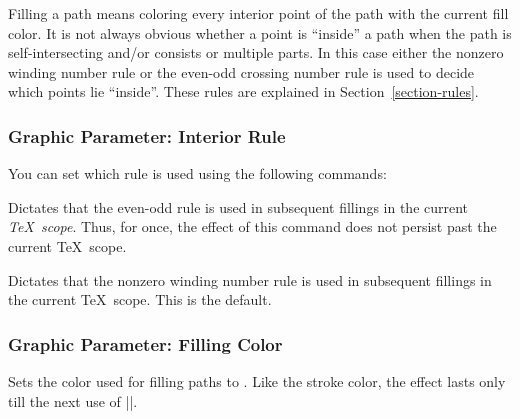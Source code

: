 Filling a path means coloring every interior point of the path with the current
fill color. It is not always obvious whether a point is ``inside'' a path when
the path is self-intersecting and/or consists or multiple parts. In this case
either the nonzero winding number rule or the even-odd crossing number rule is
used to decide which points lie ``inside''. These rules are explained in
Section~\ref{section-rules}.


\subsubsection{Graphic Parameter: Interior Rule}

You can set which rule is used using the following commands:

\begin{command}{\pgfseteorule}
    Dictates that the even-odd rule is used in subsequent fillings in the
    current \emph{\TeX\ scope}. Thus, for once, the effect of this command does
    not persist past the current \TeX\ scope.
\begin{codeexample}[]
\begin{pgfpicture}
  \pgfseteorule
  \pgfpathcircle{\pgfpoint{0mm}{0cm}}{7mm}
  \pgfpathcircle{\pgfpoint{5mm}{0cm}}{7mm}
\end{pgfpicture}
\end{codeexample}
\end{command}

\begin{command}{\pgfsetnonzerorule}
    Dictates that the nonzero winding number rule is used in subsequent
    fillings in the current \TeX\ scope. This is the default.
\begin{codeexample}[]
\begin{pgfpicture}
  \pgfsetnonzerorule
  \pgfpathcircle{\pgfpoint{0mm}{0cm}}{7mm}
  \pgfpathcircle{\pgfpoint{5mm}{0cm}}{7mm}
\end{pgfpicture}
\end{codeexample}
\end{command}


\subsubsection{Graphic Parameter: Filling Color}

\begin{command}{\pgfsetfillcolor{}}
    Sets the color used for filling paths to . Like the stroke
    color, the effect lasts only till the next use of |\color|.
\end{command}


